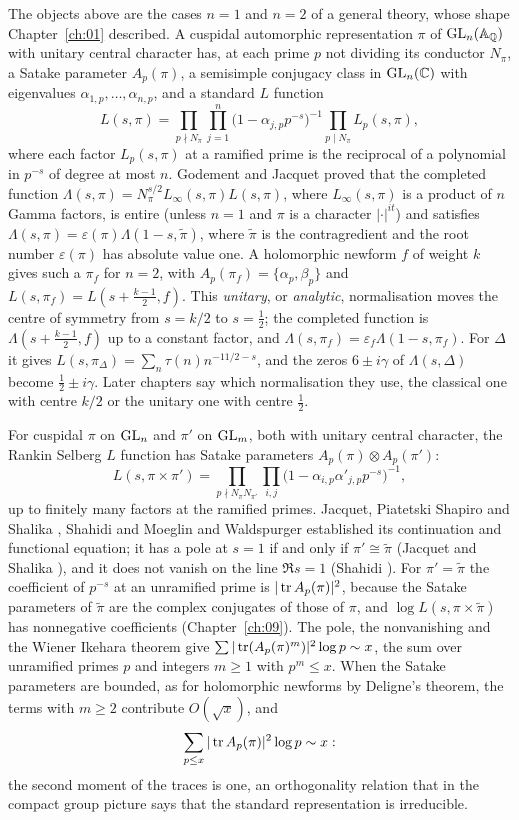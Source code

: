 The objects above are the cases $n=1$ and $n=2$ of a general theory, whose shape Chapter~\ref{ch:01} described. A cuspidal automorphic representation $\pi$ of $\mathrm{GL}_n(\mathbb{A}_{\mathbb{Q}})$ with unitary central character has, at each prime $p$ not dividing its conductor $N_\pi$, a Satake parameter $A_p(\pi)$, a semisimple conjugacy class in $\mathrm{GL}_n(\mathbb{C})$ with eigenvalues $\alpha_{1,p},\dots,\alpha_{n,p}$, and a standard $L$ function
\[
L(s,\pi)=\prod_{p\nmid N_\pi}\prod_{j=1}^n\bigl(1-\alpha_{j,p}p^{-s}\bigr)^{-1}\prod_{p\mid N_\pi}L_p(s,\pi),
\]
where each factor $L_p(s,\pi)$ at a ramified prime is the reciprocal of a polynomial in $p^{-s}$ of degree at most $n$. Godement and Jacquet \cite{godementjacquet1972} proved that the completed function $\Lambda(s,\pi)=N_\pi^{s/2}L_\infty(s,\pi)L(s,\pi)$, where $L_\infty(s,\pi)$ is a product of $n$ Gamma factors, is entire (unless $n=1$ and $\pi$ is a character $|\cdot|^{it}$) and satisfies $\Lambda(s,\pi)=\varepsilon(\pi)\Lambda(1-s,\tilde\pi)$, where $\tilde\pi$ is the contragredient and the root number $\varepsilon(\pi)$ has absolute value one. A holomorphic newform $f$ of weight $k$ gives such a $\pi_f$ for $n=2$, with $A_p(\pi_f)=\{\alpha_p,\beta_p\}$ and $L(s,\pi_f)=L(s+\frac{k-1}2,f)$. This \emph{unitary}, or \emph{analytic}, normalisation moves the centre of symmetry from $s=k/2$ to $s=\frac12$; the completed function is $\Lambda(s+\frac{k-1}2,f)$ up to a constant factor, and $\Lambda(s,\pi_f)=\varepsilon_f\Lambda(1-s,\pi_f)$. For $\Delta$ it gives $L(s,\pi_\Delta)=\sum_n\tau(n)n^{-11/2-s}$, and the zeros $6\pm i\gamma$ of $\Lambda(s,\Delta)$ become $\frac12\pm i\gamma$. Later chapters say which normalisation they use, the classical one with centre $k/2$ or the unitary one with centre $\frac12$.

For cuspidal $\pi$ on $\mathrm{GL}_n$ and $\pi'$ on $\mathrm{GL}_m$, both with unitary central character, the Rankin Selberg $L$ function has Satake parameters $A_p(\pi)\otimes A_p(\pi')$:
\[
L(s,\pi\times\pi')=\prod_{p\nmid N_\pi N_{\pi'}}\prod_{i,j}\bigl(1-\alpha_{i,p}\alpha'_{j,p}p^{-s}\bigr)^{-1},
\]
up to finitely many factors at the ramified primes. Jacquet, Piatetski Shapiro and Shalika \cite{jpss1983}, Shahidi \cite{shahidi1981} and Moeglin and Waldspurger \cite{moeglinwaldspurger1989} established its continuation and functional equation; it has a pole at $s=1$ if and only if $\pi'\cong\tilde\pi$ (Jacquet and Shalika \cite{jacquetshalika1981}), and it does not vanish on the line $\Re s=1$ (Shahidi \cite{shahidi1981}). For $\pi'=\tilde\pi$ the coefficient of $p^{-s}$ at an unramified prime is $|\operatorname{tr} A_p(\pi)|^2$, because the Satake parameters of $\tilde\pi$ are the complex conjugates of those of $\pi$, and $\log L(s,\pi\times\tilde\pi)$ has nonnegative coefficients (Chapter~\ref{ch:09}). The pole, the nonvanishing and the Wiener Ikehara theorem \cite{wiener1932,wienerikehara1931} give $\sum|\operatorname{tr}(A_p(\pi)^m)|^2\log p\sim x$, the sum over unramified primes $p$ and integers $m\ge1$ with $p^m\le x$. When the Satake parameters are bounded, as for holomorphic newforms by Deligne's theorem, the terms with $m\ge2$ contribute $O(\sqrt x)$, and
\[
\sum_{p\le x}|\operatorname{tr} A_p(\pi)|^2\log p\sim x:
\]
the second moment of the traces is one, an orthogonality relation that in the compact group picture says that the standard representation is irreducible.

